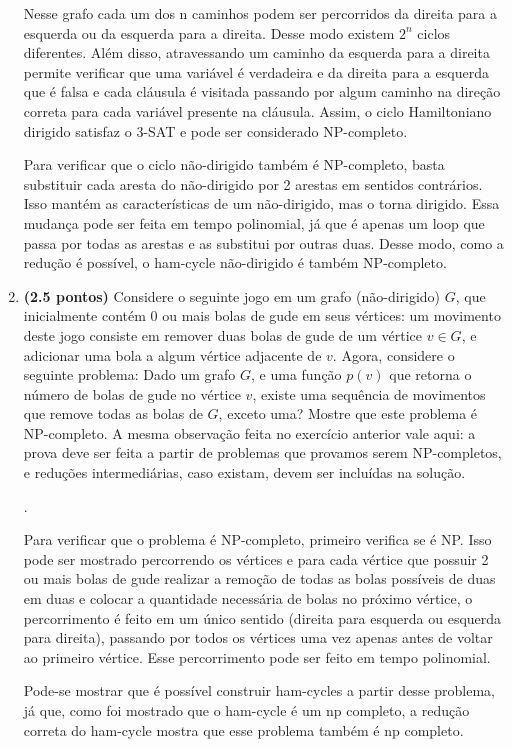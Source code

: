 \documentclass[12pt]{article}
\newcommand{\resposta}[1]{ \noindent {\bf Solução}.{\color{blue} #1}}
\begin{document}
\begin{enumerate}
{Nesse grafo cada um dos n caminhos podem ser percorridos da direita para a esquerda ou da esquerda para a direita. Desse modo existem ${2^n}$ ciclos diferentes. Além disso, atravessando um caminho da esquerda para a direita permite verificar que uma variável é verdadeira e da direita para a esquerda que é falsa e cada cláusula é visitada passando por algum caminho na direção correta para cada variável presente na cláusula. Assim, o ciclo Hamiltoniano dirigido satisfaz o 3-SAT e pode ser considerado NP-completo.

Para verificar que o ciclo não-dirigido também é NP-completo, basta substituir cada aresta do não-dirigido por 2 arestas em sentidos contrários. Isso mantém as características de um não-dirigido, mas o torna dirigido. Essa mudança pode ser feita em tempo polinomial, já que é apenas um loop que passa por todas as arestas e as substitui por outras duas. Desse modo, como a redução é possível, o ham-cycle não-dirigido é também NP-completo.


  }
  
\item {\bf (2.5 pontos)} Considere o seguinte jogo em um grafo
  (não-dirigido) $G$, que inicialmente contém 0 ou mais bolas de gude
  em seus vértices: um movimento deste jogo consiste em remover duas
  bolas de gude de um vértice $v\in G$, e adicionar uma bola a algum
  vértice adjacente de $v$. Agora, considere o seguinte problema: Dado
  um grafo $G$, e uma função $p(v)$ que retorna o número de bolas de
  gude no vértice $v$, existe uma sequência de movimentos que remove
  todas as bolas de $G$, exceto uma? Mostre que este problema é
  NP-completo. A mesma observação feita no exercício anterior vale
  aqui: a prova deve ser feita a partir de problemas que provamos
  serem NP-completos, e reduções intermediárias, caso existam, devem
  ser incluídas na solução.

  \resposta{
    Para verificar que o problema é NP-completo, primeiro verifica se é NP. Isso pode ser mostrado percorrendo os vértices e para cada vértice que possuir 2 ou mais bolas de gude realizar a remoção de todas as bolas possíveis de duas em duas e colocar a quantidade necessária de bolas no próximo vértice, o percorrimento é feito em um único sentido (direita para esquerda ou esquerda para direita), passando por todos os vértices uma vez apenas antes de voltar ao primeiro vértice. Esse percorrimento pode ser feito em tempo polinomial.

	Pode-se mostrar que é possível construir ham-cycles a partir desse problema, já que, como foi mostrado que o ham-cycle é um np completo, a redução correta do ham-cycle mostra que esse problema também é np completo.
	
}
\end{enumerate}
\end{document}
